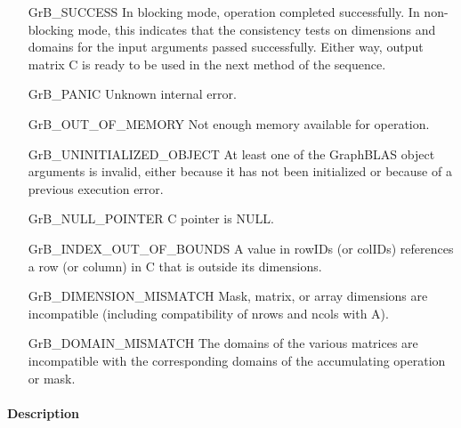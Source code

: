 \begin{itemize}[leftmargin=2.1in]
    \item[{\sf GrB\_SUCCESS}]         In blocking mode, operation
	completed successfully. In non-blocking mode, this indicates
	that the consistency tests on dimensions and domains for the
	input arguments passed successfully. Either way, output matrix
	{\sf C} is ready to be used in the next method of the sequence.

    \item[{\sf GrB\_PANIC}]           Unknown internal error.
    
    \item[{\sf GrB\_OUT\_OF\_MEMORY}]        Not enough memory available for operation.
    
    \item[{\sf GrB\_UNINITIALIZED\_OBJECT}]        At least one of the GraphBLAS object arguments is invalid, either because it has
    not been initialized or because of a previous execution error.
    
    \item[{\sf GrB\_NULL\_POINTER}]  {\sf C} pointer is {\sf NULL}.

    \item[{\sf GrB\_INDEX\_OUT\_OF\_BOUNDS}]  A value in {\sf rowIDs} (or {\sf colIDs}) references a 
	    row (or column) in {\sf C} that is outside its dimensions.
    
    \item[{\sf GrB\_DIMENSION\_MISMATCH}] Mask, matrix, or array dimensions are
	    incompatible (including compatibility of {\sf nrows} and {\sf ncols} with {\sf A}). 
    
    \item[{\sf GrB\_DOMAIN\_MISMATCH}]    The domains of the various
	matrices are incompatible with the corresponding domains of the
	accumulating operation or mask.
\end{itemize}

\paragraph{Description}

